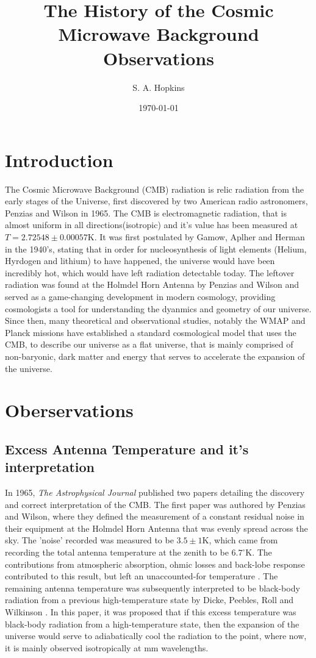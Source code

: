 \documentclass[twocolumn, prl, nobalancelastpage, aps, citeautoscript, longbibliography, 10pt]{revtex4-1}
\begin{document}
\title{The History of the Cosmic Microwave Background Observations}
\author{S. A. Hopkins}
\noaffiliation
\date{\today}

\maketitle
\section{Introduction}
The Cosmic Microwave Background (CMB) radiation is relic radiation from the early stages of the Universe, first discovered by two 
American radio astronomers, Penzias and Wilson in 1965. The CMB is electromagnetic radiation, that is almost uniform in all 
directions(isotropic) and it's value has been measured at $T = 2.72548\pm0.00057$K\cite{Fixsen}. It was first postulated by Gamow, Aplher and 
Herman in the 1940's, stating that in order for nucleosynthesis of 
light elements (Helium, Hyrdogen and lithium) to have happened, the universe would have been incredibly hot, which would have left 
radiation detectable today. The leftover radiation was found at the Holmdel Horn Antenna by Penzias and Wilson and served as a game-changing
development in modern cosmology, providing cosmologists a tool for understanding the dyanmics and geometry of our universe. 
Since then, many theoretical and observational studies, notably the WMAP and Planck missions have established a standard cosmological model 
that uses the CMB, to describe our universe as a flat universe, that is mainly comprised of non-baryonic, dark matter and energy that serves
to accelerate the expansion of the universe. 




\section{Oberservations}
\subsection{Excess Antenna Temperature and it's interpretation}
In 1965, \textit{The Astrophysical Journal} published two papers detailing the discovery and correct interpretation of the CMB.
The first paper was authored by Penzias and Wilson, where they defined the measurement of a constant residual noise
in their equipment at the Holmdel Horn Antenna that was evenly spread across the sky. The 'noise' recorded was measured 
to be $3.5 \pm 1$K, which came from recording the total antenna temperature at the zenith to be $6.7^\circ$K. The contributions
from atmospheric absorption, ohmic losses and back-lobe response contributed to this result, but left an unaccounted-for 
temperature \cite{PW}. The remaining antenna temperature was subsequently interpreted to be black-body radiation from a
previous high-temperature state by Dicke, Peebles, Roll and Wilkinson \cite{Int}. In this paper, it was proposed that if this
excess temperature was black-body radiation from a high-temperature state, then the expansion of the universe would serve to 
adiabatically cool the radiation to the point, where now, it is mainly observed isotropically at mm wavelengths.
\end{document}
